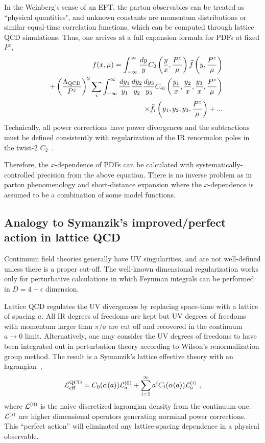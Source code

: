 \documentclass[prd,aps,twocolumn,preprintnumbers,showpacs,nofootinbib,superscriptaddress,notitlepage]{revtex4-1}
\begin{document}
In the Weinberg's sense of an EFT, the parton observables can be treated as ``physical quantities", and unknown constants are momentum distributions or similar equal-time
correlation functions, which can be computed through lattice QCD simulations. Thus, one arrives at a full expansion formula
for PDFs at fixed $P^z$, 
\begin{eqnarray}
 &&  f(x, \mu) = \int^\infty_{-\infty} \frac{dy}{y} C_2\left(\frac{y}{x}, \frac{P^z}{\mu}\right)\tilde f\left(y, \frac{P^z}{\mu}\right) \nonumber \\
  && + \left(\frac{\Lambda_{\rm QCD} }{P^z}\right)^2 \sum_i 
  \int^\infty_{-\infty} \frac{dy_1}{y_1}  \frac{dy_2}{y_2}  \frac{dy_3}{y_3} C_{4i}\left(\frac{y_1}{x}, \frac{y_2}{x},\frac{y_3}{x}, \frac{P^z}{\mu}\right) \nonumber \\ 
 && \times \tilde f_i\left(y_1,y_2,y_3,\frac{{P^z}}{\mu} \right) + ...
\end{eqnarray}
Technically, all power corrections have power divergences and the subtractions must be defined consistently with regularization of the IR renormalon poles in the twist-2 $C_2$~\cite{tHooft:1977xjm,Beneke:1998ui}. 

Therefore, the $x$-dependence of PDFs can be calculated with systematically-controlled precision from the above equation. There is no inverse problem as in parton phenomenology and short-distance expansion where the $x$-dependence is assumed to be a combination of some model functions.

\subsection{Analogy to Symanzik's improved/perfect action in lattice QCD}

Continuum field theories generally have UV singularities, and are not well-defined unless there is a proper cut-off. The well-known dimensional regularization works only for perturbative calculations in which Feynman integrals can be performed in $D=4-\epsilon$ dimension. 

Lattice QCD regulates the UV divergences by replacing
space-time with a lattice of spacing $a$.
All IR degrees of freedoms are kept but UV degrees of freedoms with momentum larger than $\pi/a$ are cut off and recovered in the continuum $a\to 0$ limit. Alternatively, one may consider the UV degrees of freedoms to have been integrated out in perturbation theory according to Wilson's renormalization group method. The result is a Symanzik's lattice effective theory with an 
lagrangian~\cite{Symanzik:1983dc,Symanzik:1983gh},  
\begin{equation}
  {\cal L}_{\rm eff}^{\rm QCD} = C_0(\alpha(a)){\cal L}^{(0)}_a + \sum_{i=1}^\infty a^i C_i(\alpha(a)){\cal L}^{(i)}_a \ , 
\end{equation}
where ${\cal L}^{(0)}$ is the naive discretized lagrangian density from the continuum one.  ${\cal L}^{(i)}$ are higher dimensional operators generating norminal power corrections. This ``perfect action'' will
eliminated any lattice-spacing dependence in a physical observable. 
\end{document}
